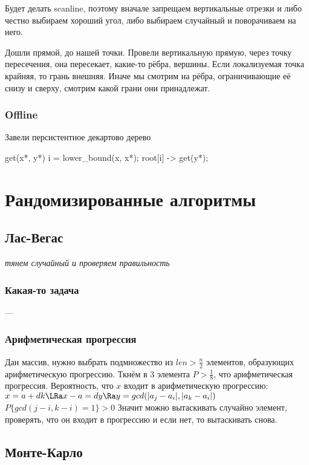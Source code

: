 Будет делать scanline, поэтому вначале запрещаем вертикальные отрезки и либо честно выбираем
хороший угол, либо выбираем случайный и поворачиваем на него.

Дошли прямой, до нашей точки. Провели вертикальную прямую, через точку пересечения, 
она пересекает, какие-то рёбра, вершины. Если локализуемая точка крайняя, 
то грань внешняя. Иначе мы смотрим на рёбра, ограничивающие её снизу и сверху, 
смотрим какой грани они принадлежат.

\subsection{Offline}

Завели персистентное декартово дерево

\begin{cppcode}
    get(x*, y*)
    i = lower\_bound(x, x*);
    root[i] -> get(y*);
\end{cppcode}


\chapter{Рандомизированные алгоритмы}

\section{Лас-Вегас}

\textit{тянем случайный и проверяем правильность}

\subsection{Какая-то задача}
---

\subsection{Арифметическая прогрессия}
Дан массив, нужно выбрать подмножество из $len > \frac{n}{2}$ элементов, образующих
арифметическую прогрессию. Ткнём в 3 элемента $P > \frac{1}{8}$, что арифметическая
прогрессия. Вероятность, что $x$ входит в арифметическую прогрессию: 
$x = a + dk \LRa x-a = dy \Ra y = gcd(|a_j - a_i|, |a_k - a_i|)$
$P\{gcd(j-i, k-i) = 1\} > 0$
Значит можно вытаскивать случайно элемент, проверять, что он входит в прогрессию и если
нет, то вытаскивать снова.


\section{Монте-Карло}

